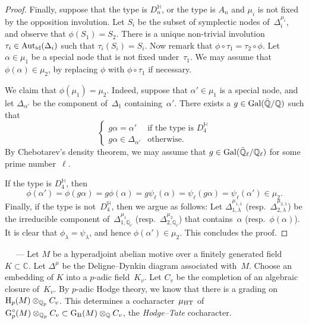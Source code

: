 \documentclass[10pt,twoside,leqno]{article}
\renewcommand{\paragraph}[1]{\par\bigskip\refstepcounter{subsection}%
 {\normalfont\normalsize\scshape\noindent\thesubsection%
 \ifthenelse{\equal{#1}{}}%
 {}%
 {\ \textls{#1.}}%
 \ ---}%
}
\numberwithin{equation}{subsection}
\newcommand{\id}{\textnormal{id}}
\newcommand{\Aut}{\textnormal{Aut}}
\newcommand{\QQ}{\mathbb{Q}}
\newcommand{\QQbar}{\bar{\QQ}}
\newcommand{\QQl}{\QQ_{\ell}}
\newcommand{\QQlbar}{\QQbar_{\ell}}
\newcommand{\QQp}{\QQ_{p}}
\newcommand{\CC}{\mathbb{C}}
\newcommand{\HQ}{\mathbb{H}}
\newcommand{\Gal}{\textnormal{Gal}}
\newcommand{\HT}{\textnormal{HT}}
\newcommand{\HH}{\textnormal{H}}
\newcommand{\Hp}{\HH_{p}}
\newcommand{\GG}{\textnormal{G}}
\newcommand{\GB}{\GG_{\textnormal{B}}}
\newcommand{\Gp}{\GG_{p}}
\newcommand{\Gpc}{\Gp^{\circ}}
\begin{document}
\begin{proposition}
\begin{proof}
  Finally, suppose that the type is $D_n^\HQ$,
  or the type is $A_n$ and $\mu_i$ is not fixed by the opposition involution.
  Let $S_i$ be the subset of symplectic nodes of~$\Delta_i^{\mu_i}$,
  and observe that $\phi(S_1) = S_2$.
  There is a unique non-trivial involution~$\tau_i \in \Aut_\id(\Delta_i)$
  such that $\tau_i(S_i) = S_i$.
  Now remark that $\phi \circ \tau_1 = \tau_2 \circ \phi$.
  Let $\alpha \in \mu_1$ be a special node that is not fixed under~$\tau_1$.
  We may assume that $\phi(\alpha) \in \mu_2$,
  by replacing $\phi$ with $\phi \circ \tau_1$ if necessary.
  
  We claim that $\phi(\mu_1) = \mu_2$.
  Indeed, suppose that $\alpha' \in \mu_1$ is a special node, and
  let $\Delta_{\alpha'}$ be the component of~$\Delta_1$ containing~$\alpha'$.
  There exists a $g \in \Gal(\QQbar/\QQ)$ such that
  \[
   \begin{cases}
    g\alpha = \alpha' &\text{if the type is~$D_4^\HQ$}\\
    g\alpha \in \Delta_{\alpha'} &\text{otherwise.}
   \end{cases}
  \]
  By Chebotarev's density theorem,
  we may assume that $g \in \Gal(\QQlbar/\QQl)$
  for some prime number~$\ell$.

  If the type is $D_4^\HQ$, then
  \[
   \phi(\alpha') = \phi(g\alpha) = g\phi(\alpha) = g\psi_\ell(\alpha)
   = \psi_\ell(g\alpha) = \psi_\ell(\alpha') \in \mu_2.
  \]
  Finally, if the type is not~$D_4^\HQ$, then we argue as follows:
  Let $\Delta_{1,\lambda}^{\mu_{1,\lambda}}$
  (resp.~$\Delta_{2,\lambda}^{\mu_{2,\lambda}}$)
  be the irreducible component of~$\Delta_{1,\QQl}^{\mu_1}$
  (resp.\ $\Delta_{2,\QQl}^{\mu_2}$)
  that contains~$\alpha$ (resp.~$\phi(\alpha)$).
  It is clear that $\phi_\lambda = \psi_\lambda$,
  and hence $\phi(\alpha') \in \mu_2$.
  This concludes the proof.
 \end{proof}
\end{proposition}

\paragraph{} %
Let $M$ be a hyperadjoint abelian motive
over a finitely generated field $K \subset \CC$.
Let $\Delta^\mu$ be the Deligne--Dynkin diagram associated with~$M$.
Choose an embedding of $K$ into a $p$-adic field~$K_v$.
Let $C_v$ be the completion of an algebraic closure of~$K_v$.
By $p$-adic Hodge theory,
we know that there is a grading on $\Hp(M) \otimes_{\QQp} C_v$.
This determines a cocharacter~$\mu_{\HT}$ of
$\Gpc(M) \otimes_{\QQp} C_v \subset \GB(M) \otimes_\QQ C_v$,
the \emph{Hodge--Tate} cocharacter.
\end{document}
